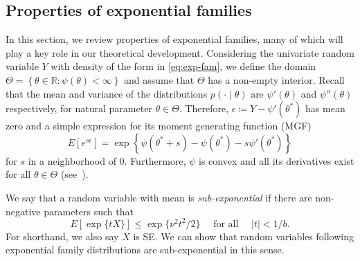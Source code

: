 \documentclass[ejs,noshowframe]{imsart}
\theoremstyle{plain}
\theoremstyle{definition}
\newcommand{\R}{\mathbb{R}}
\newcommand{\E}{E}
\newcommand{\Expect}[1]{\E\left[#1\right]}
\newcommand{\given}{\mid}
\begin{document}
\subsection{Properties of exponential families}
\label{sec:prop-expon-famil}


In this section, we review properties of exponential families, many of which
will play a key role in our theoretical development. Considering the univariate
random variable $Y$ with density of the form in
\eqref{eq:exp-fam}, we define the
domain $\Theta = \left\{ \theta\in \R : \psi(\theta)<\infty\right\}$ 
and assume that
$\Theta$ has a non-empty interior.  
Recall that the mean and variance of the distributions $p(\cdot \given \theta)$
are $\psi'(\theta)$ and $\psi''(\theta)$ respectively, for natural parameter
$\theta\in\Theta$. Therefore, $\epsilon\coloneqq Y - \psi'(\theta^*)$ has mean
zero and
a simple expression for its moment generating function (MGF)
\begin{equation}
  \label{eq:exp-fam-mgf-centered}
  \Expect{e^{s\epsilon}} =  \exp
  \left\{\psi(\theta^* + s) - \psi(\theta^*)-s \psi'(\theta^*)\right\}
\end{equation}
for $s$ in a neighborhood of 0. Furthermore,
$\psi$ is convex and all its derivatives exist for all $\theta\in 
\Theta$ (see~\citealt{Brown1986}).

We say that a random variable  with mean  is 
\emph{sub-exponential} if 
there are
non-negative parameters  such that 
$$\Expect{\exp\{t X\}} \leq \exp\{\nu^{2} t^{2} / 2\} \quad
\text{ for all }\quad |t| < 1 / b.$$ 
For shorthand, we also say $X$ is SE. We
can show that random variables following exponential family distributions are 
sub-exponential in this sense. 
\end{document}
